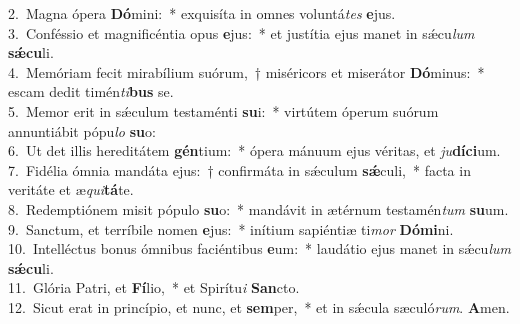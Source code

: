 {2.~}Magna ópera \textbf{Dó}mini:~* exquisíta in omnes voluntá\textit{tes} \textbf{e}jus.\\
{3.~}Conféssio et magnificéntia opus \textbf{e}jus:~* et justítia ejus manet in sǽcu\textit{lum} \textbf{sǽ}\textbf{cu}li.\\
{4.~}Memóriam fecit mirabílium suórum,~† miséricors et miserátor \textbf{Dó}minus:~* escam dedit timén\textit{ti}\textbf{bus} se.\\
{5.~}Memor erit in sǽculum testaménti \textbf{su}i:~* virtútem óperum suórum annuntiábit pópu\textit{lo} \textbf{su}o:\\
{6.~}Ut det illis hereditátem \textbf{gén}tium:~* ópera mánuum ejus véritas, et \textit{ju}\textbf{dí}\textbf{ci}um.\\
{7.~}Fidélia ómnia mandáta ejus:~† confirmáta in sǽculum \textbf{sǽ}culi,~* facta in veritáte et æ\textit{qui}\textbf{tá}te.\\
{8.~}Redemptiónem misit pópulo \textbf{su}o:~* mandávit in ætérnum testamén\textit{tum} \textbf{su}um.\\
{9.~}Sanctum, et terríbile nomen \textbf{e}jus:~* inítium sapiéntiæ ti\textit{mor} \textbf{Dó}\textbf{mi}ni.\\
{10.~}Intelléctus bonus ómnibus faciéntibus \textbf{e}um:~* laudátio ejus manet in sǽcu\textit{lum} \textbf{sǽ}\textbf{cu}li.\\
{11.~}Glória Patri, et \textbf{Fí}lio,~* et Spirítu\textit{i} \textbf{San}cto.\\
{12.~}Sicut erat in princípio, et nunc, et \textbf{sem}per,~* et in sǽcula sæculó\textit{rum}. \textbf{A}men.\\

